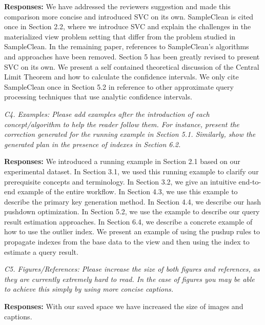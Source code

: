 \vspace{.25em}

{\bf Responses:} We have addressed the reviewers suggestion and made this comparison more concise and introduced SVC on its own. SampleClean is cited once in Section 2.2, where we introduce SVC and explain the challenges in the materialized view problem setting that differ from the problem studied in SampleClean. In the remaining paper, references to SampleClean’s algorithms and approaches have been removed. Section 5 has been greatly revised to present SVC on its own. We present a self contained theoretical discussion of the Central Limit Theorem and how to calculate the confidence intervals. We only cite SampleClean once in Section 5.2 in reference to other approximate query processing techniques that use analytic confidence intervals.

\vspace{1em}
\emph{C4. Examples: Please add examples after the introduction of each concept/algorithm to help the reader follow them. For instance, present the correction generated for the running example in Section 5.1. Similarly, show the generated plan in the presence of indexes in Section 6.2.}

\vspace{.25em}

{\bf Responses:} We introduced a running example in Section 2.1 based on our experimental dataset. In Section 3.1, we used this running example to clarify our prerequisite concepts and terminology. In Section 3.2, we give an intuitive end-to-end example of the entire workflow. In Section 4.3, we use this example to describe the primary key generation method. In Section 4.4, we describe our hash pushdown optimization. In Section 5.2, we use the example to describe our query result estimation approaches.  In Section 6.4, we describe a concrete example of how to use the outlier index. We present an example of using the pushup rules to propagate indexes from the base data to the view and then using the index to estimate a query result. 

\vspace{1em}
\emph{C5. Figures/References: Please increase the size of both figures and references, as they are currently extremely hard to read. In the case of figures you may be able to achieve this simply by using more concise captions.}

\vspace{.25em}

{\bf Responses:} With our saved space we have increased the size of images and captions.

